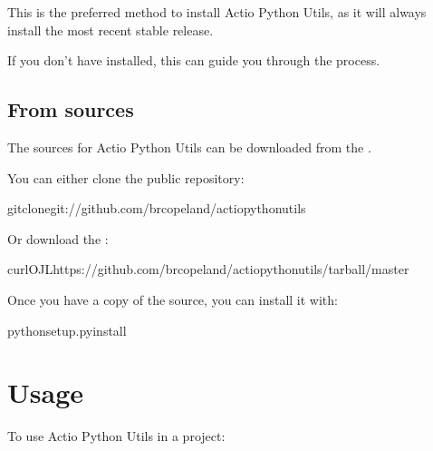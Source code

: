 \documentclass[letterpaper,10pt,english]{sphinxmanual}
\begin{document}
\sphinxAtStartPar
This is the preferred method to install Actio Python Utils, as it will always install the most recent stable release.

\sphinxAtStartPar
If you don’t have  installed, this  can guide
you through the process.


\section{From sources}
\label{\detokenize{installation:from-sources}}
\sphinxAtStartPar
The sources for Actio Python Utils can be downloaded from the .

\sphinxAtStartPar
You can either clone the public repository:

\begin{sphinxVerbatim}[commandchars=\\\{\}]
gitclonegit://github.com/brcopeland/actio\PYGZus{}python\PYGZus{}utils
\end{sphinxVerbatim}

\sphinxAtStartPar
Or download the :

\begin{sphinxVerbatim}[commandchars=\\\{\}]
curl\PYGZhy{}OJLhttps://github.com/brcopeland/actio\PYGZus{}python\PYGZus{}utils/tarball/master
\end{sphinxVerbatim}

\sphinxAtStartPar
Once you have a copy of the source, you can install it with:

\begin{sphinxVerbatim}[commandchars=\\\{\}]
pythonsetup.pyinstall
\end{sphinxVerbatim}

\sphinxstepscope


\chapter{Usage}
\label{\detokenize{usage:usage}}\label{\detokenize{usage::doc}}
\sphinxAtStartPar
To use Actio Python Utils in a project:
\end{document}
